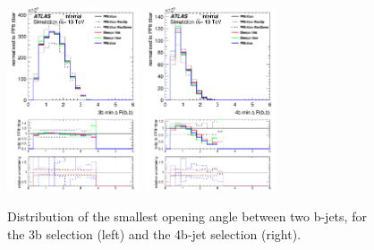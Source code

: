 \begin{figure}[!htb]
\centering
\includegraphics[width=0.35\textwidth]{Plots/ttbb/hisgenEvt_Dr_MinDeltaRGenBJets_4j3t__div}
\includegraphics[width=0.35\textwidth]{Plots/ttbb/hisgenEvt_Dr_MinDeltaRGenBJets_4j4t__div}
  \caption{Distribution of the smallest opening angle between two b-jets, for the 3b selection (left) and the 4b-jet selection (right). \label{ttbb:mindR}}
\end{figure}

